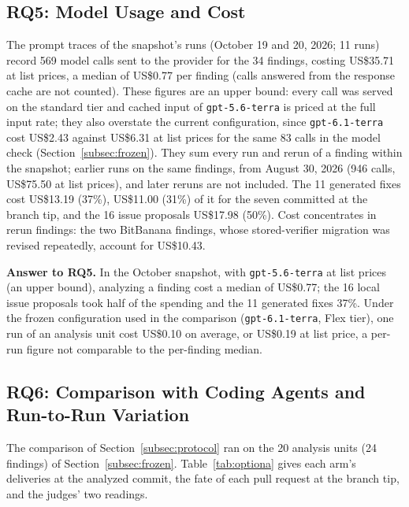\documentclass[conference]{IEEEtran}
\newcommand{\researchq}[1]{\textbf{RQ#1}}
\begin{document}
\subsection{\researchq{5}: Model Usage and Cost}

The prompt traces of the snapshot's runs (October 19 and 20, 2026;
11 runs) record 569 model calls sent to the provider for the 34 findings,
costing US\$35.71 at list prices, a median of US\$0.77 per finding (calls
answered from the response cache are not counted). These figures are an upper
bound: every call was served on the standard tier and cached input of
\texttt{gpt-5.6-terra} is priced at the full input rate; they also overstate
the current configuration, since \texttt{gpt-6.1-terra} cost US\$2.43 against US\$6.31 at list prices
for the same 83 calls in the model check (Section~\ref{subsec:frozen}). They sum every run and
rerun of a finding within the snapshot; earlier runs on the same findings, from
August 30, 2026 (946 calls, US\$75.50 at list prices), and later reruns are not
included. The 11 generated fixes cost US\$13.19 (37\%), US\$11.00 (31\%) of it
for the seven committed at the branch tip, and the 16 issue proposals
US\$17.98 (50\%). Cost
concentrates in rerun findings: the two BitBanana findings, whose
stored-verifier migration was revised repeatedly, account for US\$10.43.

\textbf{Answer to \researchq{5}.} In the October snapshot, with
\texttt{gpt-5.6-terra} at list prices (an upper bound), analyzing a finding
cost a median of US\$0.77; the 16 local issue proposals took half of the
spending and the 11 generated fixes 37\%. Under the
frozen configuration used in the comparison (\texttt{gpt-6.1-terra}, Flex
tier), one run of an analysis unit cost US\$0.10 on average, or US\$0.19 at
list price, a per-run figure not comparable to the per-finding median.

\subsection{\researchq{6}: Comparison with Coding Agents and Run-to-Run Variation}
\label{subsec:rq6}

The comparison of Section~\ref{subsec:protocol} ran on the 20 analysis units
(24 findings) of Section~\ref{subsec:frozen}.
Table~\ref{tab:optiona} gives each arm's deliveries at the analyzed commit, the
fate of each pull request at the branch tip, and the judges' two readings.
\end{document}
